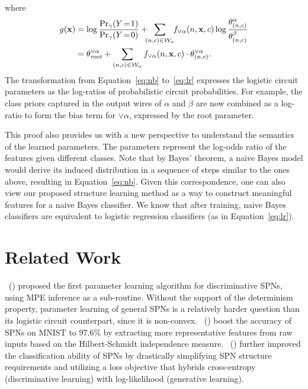 \documentclass[letterpaper]{article} %
\newcommand{\sample}{{\bf x}}
\newcommand{\citet}[1]{\citeauthor{#1}~(\citeyear{#1})}
\begin{document}
where
\begin{align}
g(\sample)&= \log\frac{\Pr_\gamma(Y\!=\!1)}{\Pr_\gamma(Y\!=\!0)} + \!\!\!\sum_{(n,c) \in \mathcal{W}_{\alpha}} \!\!  f_{\lor \alpha}(n,\sample,c) \log \frac{\theta^\alpha_{(n,c)}}{\theta^\beta_{(n,c)}}  \label{eq:nb}\\
&=\theta^{\lor \alpha}_{\mathit{root}} + \sum_{(n,c) \in \mathcal{W}_{\alpha}}f_{\lor \alpha}(n,\sample,c) \cdot \theta_{(n,c)}^{\lor \alpha}. \label{eq:lr}
\end{align}
The transformation from Equation~\ref{eq:nb} to~\ref{eq:lr} expresses the logistic circuit parameters as the  log-ratios of probabilistic circuit probabilities.
For example, the class priors captured in the output wires of $\alpha$ and $\beta$ are now combined as a log-ratio to form the bias term for $\lor \alpha$, expressed by the root parameter.

This proof also provides us with a new perspective to understand the semantics of the learned parameters.
The parameters represent the log-odds ratio of the features given different classes. Note that by Bayes' theorem, a naive Bayes model would derive its induced distribution in a sequence of steps similar to the ones above, resulting in Equation~\ref{eq:nb}. Given this correspondence, one can also view our proposed structure learning method as a way to construct meaningful features for a naive Bayes classifier. We know that after training, naive Bayes classifiers are equivalent to logistic regression classifiers (as in Equation~\ref{eq:lr}).



 \section{Related Work}
\citet{gens2012discriminative} proposed the first parameter learning algorithm for discriminative SPNs, using MPE inference as a sub-routine. Without the support of the determinism property, parameter learning of general SPNs is a relatively harder question than its logistic circuit counterpart, since it is non-convex. \citet{adel2015learning} boost the accuracy of SPNs on MNIST to  $97.6\%$ by extracting more representative features from raw inputs based on the Hilbert-Schmidt independence measure.
\citet{rat-spn2018} further improved the  classification ability of SPNs by drastically simplifying SPN structure requirements and utilizing a loss objective that hybrids cross-entropy (discriminative learning) with log-likelihood (generative learning).
\end{document}
